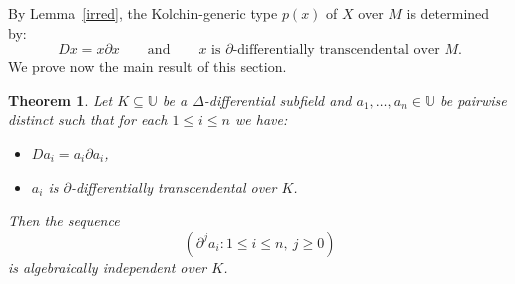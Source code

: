 \documentclass[10pt,a4paper]{amsart}
\newtheorem{theorem}{Theorem}[section]
\newcommand{\Uu}{{\mathds{U}}}
\begin{document}
By Lemma~\ref{irred}, the
Kolchin-generic type $p(x)$ of $X$ over $M$ is determined by:
\[
Dx=x\partial x\qquad \text{and}\qquad \text{$x$ is $\partial$-differentially transcendental over $M$}.
\]
We prove now the main result of this section.
\begin{theorem}\label{independence}
Let $K\subseteq \Uu$ be a $\Delta$-differential subfield and $a_1,\ldots,a_n\in \Uu$ be pairwise distinct such that for each $1\leqslant i\leqslant n$ we have:
\begin{itemize}
  \item $ Da_i=a_i\partial a_i$,
  \item $a_i$ is $\partial$-differentially transcendental over $K$.
\end{itemize}
Then the sequence
\[
 (\partial^j a_i:1\leqslant i\leqslant n,\ j\geqslant0)
\]
is algebraically independent over $K$.
\end{theorem}
\end{document}
